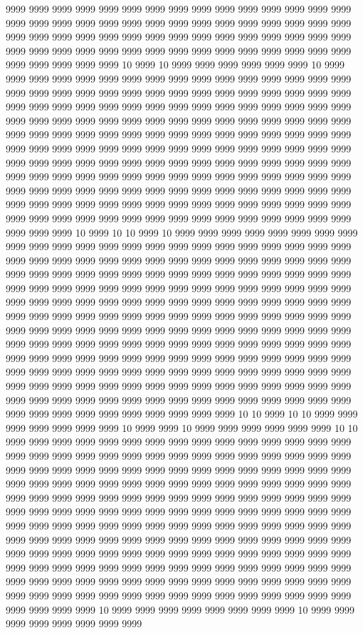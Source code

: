 9999 9999 9999 9999 9999 9999 9999 9999 9999 9999 9999 9999 9999 9999 9999 9999 9999 9999 9999 9999 9999 9999 9999 9999 9999 9999 9999 9999 9999 9999 9999 9999 9999 9999 9999 9999 9999 9999 9999 9999 9999 9999 9999 9999 9999 9999 9999 9999 9999 9999 9999 9999 9999 9999 9999 9999 9999 9999 9999 9999 9999 9999 9999 9999 9999 10 9999 10 9999 9999 9999 9999 9999 9999 10 9999 9999 9999 9999 9999 9999 9999 9999 9999 9999 9999 9999 9999 9999 9999 9999 9999 9999 9999 9999 9999 9999 9999 9999 9999 9999 9999 9999 9999 9999 9999 9999 9999 9999 9999 9999 9999 9999 9999 9999 9999 9999 9999 9999 9999 9999 9999 9999 9999 9999 9999 9999 9999 9999 9999 9999 9999 9999 9999 9999 9999 9999 9999 9999 9999 9999 9999 9999 9999 9999 9999 9999 9999 9999 9999 9999 9999 9999 9999 9999 9999 9999 9999 9999 9999 9999 9999 9999 9999 9999 9999 9999 9999 9999 9999 9999 9999 9999 9999 9999 9999 9999 9999 9999 9999 9999 9999 9999 9999 9999 9999 9999 9999 9999 9999 9999 9999 9999 9999 9999 9999 9999 9999 9999 9999 9999 9999 9999 9999 9999 9999 9999 9999 9999 9999 9999 9999 9999 9999 9999 9999 9999 9999 9999 9999 9999 9999 9999 9999 9999 9999 9999 9999 9999 9999 9999 9999 9999 9999 9999 9999 9999 9999 9999 9999 9999 9999 9999 9999 10 9999 10 10 9999 10 9999 9999 9999 9999 9999 9999 9999 9999 9999 9999 9999 9999 9999 9999 9999 9999 9999 9999 9999 9999 9999 9999 9999 9999 9999 9999 9999 9999 9999 9999 9999 9999 9999 9999 9999 9999 9999 9999 9999 9999 9999 9999 9999 9999 9999 9999 9999 9999 9999 9999 9999 9999 9999 9999 9999 9999 9999 9999 9999 9999 9999 9999 9999 9999 9999 9999 9999 9999 9999 9999 9999 9999 9999 9999 9999 9999 9999 9999 9999 9999 9999 9999 9999 9999 9999 9999 9999 9999 9999 9999 9999 9999 9999 9999 9999 9999 9999 9999 9999 9999 9999 9999 9999 9999 9999 9999 9999 9999 9999 9999 9999 9999 9999 9999 9999 9999 9999 9999 9999 9999 9999 9999 9999 9999 9999 9999 9999 9999 9999 9999 9999 9999 9999 9999 9999 9999 9999 9999 9999 9999 9999 9999 9999 9999 9999 9999 9999 9999 9999 9999 9999 9999 9999 9999 9999 9999 9999 9999 9999 9999 9999 9999 9999 9999 9999 9999 9999 9999 9999 9999 9999 9999 9999 9999 9999 9999 9999 9999 9999 9999 9999 9999 9999 9999 9999 9999 9999 9999 9999 9999 9999 9999 9999 9999 9999 9999 9999 9999 10 10 9999 10 10 9999 9999 9999 9999 9999 9999 9999 10 9999 9999 10 9999 9999 9999 9999 9999 9999 10 10 9999 9999 9999 9999 9999 9999 9999 9999 9999 9999 9999 9999 9999 9999 9999 9999 9999 9999 9999 9999 9999 9999 9999 9999 9999 9999 9999 9999 9999 9999 9999 9999 9999 9999 9999 9999 9999 9999 9999 9999 9999 9999 9999 9999 9999 9999 9999 9999 9999 9999 9999 9999 9999 9999 9999 9999 9999 9999 9999 9999 9999 9999 9999 9999 9999 9999 9999 9999 9999 9999 9999 9999 9999 9999 9999 9999 9999 9999 9999 9999 9999 9999 9999 9999 9999 9999 9999 9999 9999 9999 9999 9999 9999 9999 9999 9999 9999 9999 9999 9999 9999 9999 9999 9999 9999 9999 9999 9999 9999 9999 9999 9999 9999 9999 9999 9999 9999 9999 9999 9999 9999 9999 9999 9999 9999 9999 9999 9999 9999 9999 9999 9999 9999 9999 9999 9999 9999 9999 9999 9999 9999 9999 9999 9999 9999 9999 9999 9999 9999 9999 9999 9999 9999 9999 9999 9999 9999 9999 9999 9999 9999 9999 9999 9999 9999 9999 9999 9999 9999 9999 9999 9999 9999 9999 9999 9999 9999 9999 9999 9999 9999 9999 9999 9999 10 9999 9999 9999 9999 9999 9999 9999 9999 10 9999 9999 9999 9999 9999 9999 9999 9999 